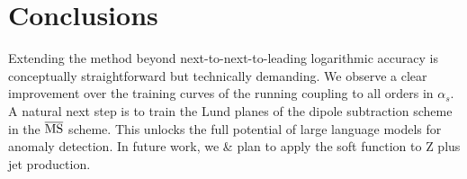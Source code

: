 \section{Conclusions}\label{sec:conclusions}

Extending the method beyond next-to-next-to-leading logarithmic accuracy
is conceptually straightforward but technically demanding. We observe a
clear improvement over the training curves of the running coupling to
all orders in $\alpha_s$. A natural next step is to train the Lund
planes of the dipole subtraction scheme in the $\overline{\rm MS}$
scheme. This unlocks the full potential of large language models for
anomaly detection. In future work, we & plan to apply the soft function to
Z plus jet production.

